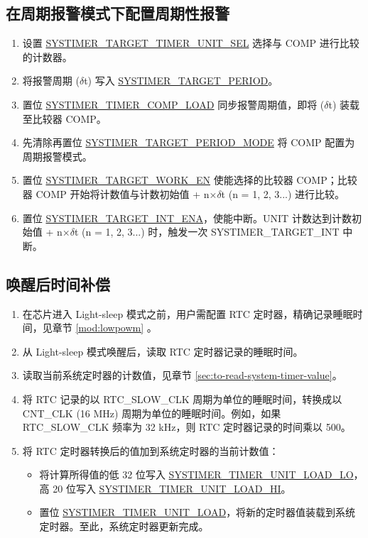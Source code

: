 \documentclass[main\_\_CN.tex]{subfiles}
\begin{document}
\subsection{在周期报警模式下配置周期性报警}
\begin{enumerate}
    \item 设置 \hyperref[fielddesc:SYSTIMERTARGET0TIMERUNITSEL]{SYSTIMER\_TARGET\_TIMER\_UNIT\_SEL} 选择与 COMP 进行比较的计数器。
    \item 将报警周期 ($\delta$t) 写入 \hyperref[fielddesc:SYSTIMERTARGET0PERIOD]{SYSTIMER\_TARGET\_PERIOD}。
    \item 置位 \hyperref[fielddesc:SYSTIMERTIMERCOMP0LOAD]{SYSTIMER\_TIMER\_COMP\_LOAD} 同步报警周期值，即将 ($\delta$t) 装载至比较器 COMP。
    \item 先清除再置位 \hyperref[fielddesc:SYSTIMERTARGET0PERIODMODE]{SYSTIMER\_TARGET\_PERIOD\_MODE} 将 COMP 配置为周期报警模式。
    \item 置位 \hyperref[fielddesc:SYSTIMERTARGET0WORKEN]{SYSTIMER\_TARGET\_WORK\_EN} 使能选择的比较器 COMP；比较器 COMP 开始将计数值与计数初始值 + n×$\delta$t (n = 1, 2, 3...) 进行比较。
    \item 置位 \hyperref[fielddesc:SYSTIMERTARGET0INTENA]{SYSTIMER\_TARGET\_INT\_ENA}，使能中断。UNIT 计数达到计数初始值 + n×$\delta$t (n = 1, 2, 3...) 时，触发一次 SYSTIMER\_TARGET\_INT 中断。
\end{enumerate}


\subsection{唤醒后时间补偿}
\begin{enumerate}
    \item 在芯片进入 Light-sleep 模式之前，用户需配置 RTC 定时器，精确记录睡眠时间，见章节 \ref{mod:lowpowm} \textit{}。
    \item 从 Light-sleep 模式唤醒后，读取 RTC 定时器记录的睡眠时间。
    \item 读取当前系统定时器的计数值，见章节  \ref{sec:to-read-system-timer-value}。
    \item 将 RTC 记录的以 RTC\_SLOW\_CLK 周期为单位的睡眠时间，转换成以 CNT\_CLK (16 MHz) 周期为单位的睡眠时间。例如，如果 RTC\_SLOW\_CLK 频率为 32 kHz，则 RTC 定时器记录的时间乘以 500。
    \item 将 RTC 定时器转换后的值加到系统定时器的当前计数值：
    \begin{itemize}
        \item 将计算所得值的低 32 位写入 \hyperref[fielddesc:SYSTIMERTIMERUNIT0LOADLO]{SYSTIMER\_TIMER\_UNIT\_LOAD\_LO}，高 20 位写入 \hyperref[fielddesc:SYSTIMERTIMERUNIT0LOADHI]{SYSTIMER\_TIMER\_UNIT\_LOAD\_HI}。
        \item 置位 \hyperref[fielddesc:SYSTIMERTIMERUNIT0LOAD]{SYSTIMER\_TIMER\_UNIT\_LOAD}，将新的定时器值装载到系统定时器。至此，系统定时器更新完成。
        \end{itemize}
\end{enumerate}
\end{document}
